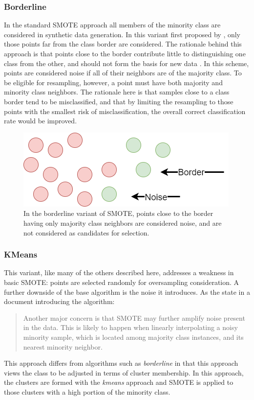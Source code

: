 \documentclass[letterpaper]{article}
\begin{document}
{\subsubsection{Borderline}
In the standard SMOTE approach all members of the minority class are considered in synthetic data generation. In this variant first proposed by \citeauthor{Han2005-ui}, only those points far from the class border are considered. The rationale behind this approach is that points close to the border contribute little to distinguishing one class from the other, and should not form the basis for new data \cite{Han2005-ui}. In this scheme, points are considered noise if all of their neighbors are of the majority class. To be eligible for resampling, however, a point must have both majority and minority class neighbors. The rationale here is that samples close to a class border tend to be misclassified, and that by limiting the resampling to those points with the smallest risk of misclassification, the overall correct classification rate would be improved.
\begin{figure}[H]
	\centering
	\includegraphics[scale=0.30]{./figures/borderline.png}
	\caption[Borderline selection of synthetic data points]{In the borderline variant of SMOTE, points close to the border having only majority class neighbors are considered noise, and are not considered as candidates for selection. }
	\label{fig:borderline}
\end{figure}
%
%


\subsubsection{KMeans}
This variant, like many of the others described here, addresses a weakness in basic SMOTE: points are selected randomly for oversampling consideration. A further downside of the base algorithm is the noise it introduces. As the \citeauthor{Last2017-rh} state in a document introducing the algorithm:
\begin{quote}
Another major concern is that SMOTE may further amplify noise present in the data. This is likely
to happen when linearly interpolating a noisy minority sample, which is located among majority class
instances, and its nearest minority neighbor. \parencite{Last2017-rh}
\end{quote}
This approach differs from algorithms such as \textit{borderline} in that this approach views the class to be adjusted in terms of cluster membership.  In this approach, the clusters are formed with the \textit{kmeans} approach and SMOTE is applied to those clusters with a high portion of the minority class.

}
\end{document}
